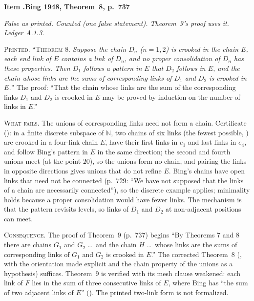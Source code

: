 \documentclass[11pt]{article}
\newcounter{defect}
\newenvironment{defect}[4]{%
  \par\addvspace{10pt}\refstepcounter{defect}%
  \noindent\textbf{Item \thedefect.\enspace #1}\par\nopagebreak
  \noindent\textit{#2}\par\nopagebreak\smallskip}{\par\addvspace{6pt}}
\newcommand{\fld}[1]{\par\noindent\textsc{#1.}\enspace}
\begin{document}
\begin{defect}{Bing 1948, Theorem~8, p.~737}{False as printed. Counted (one false statement).
Theorem~9's proof uses it. Ledger A.1.3.}{1}{0}\label{it:b48-8}

\fld{Printed} ``\textsc{Theorem 8.} \emph{Suppose the chain $D_n$ ($n=1,2$) is crooked in the chain
$E$, each end link of $E$ contains a link of $D_n$, and no proper consolidation of $D_n$ has these
properties. Then $D_1$ follows a pattern in $E$ that $D_2$ follows in $E$, and the chain whose
links are the sums of corresponding links of $D_1$ and $D_2$ is crooked in $E$.}'' The proof:
``That the chain whose links are the sum of the corresponding links $D_1$ and $D_2$ is crooked in
$E$ may be proved by induction on the number of links in $E$.''

\fld{What fails} The unions of corresponding links need not form a chain. Certificate
(): in a finite discrete subspace of $\mathbb N$, two chains of six links
(the fewest possible, ) are crooked in a four-link chain $E$, have their
first links in $e_1$ and last links in $e_4$, and follow Bing's pattern in $E$ in the same
direction; the second and fourth unions meet (at the point $20$), so the unions form no chain, and
pairing the links in opposite directions gives unions that do not refine $E$. Bing's chains have
open links that need not be connected (p.~729: ``We have not supposed that the links of a chain
are necessarily connected''), so the discrete example applies; minimality holds because a proper
consolidation would have fewer links. The mechanism is that the pattern revisits levels, so links
of $D_1$ and $D_2$ at non-adjacent positions can meet.

\fld{Consequence} The proof of Theorem~9 (p.~737) begins ``By Theorems 7 and 8 there are chains
$G_1$ and $G_2$ \ldots\ and the chain $H$ \ldots\ whose links are the sums of corresponding links
of $G_1$ and $G_2$ is crooked in $E$.'' The corrected Theorem~8 (, with the
orientation made explicit and the chain property of the unions as a hypothesis) suffices.
Theorem~9 is verified with its mesh clause weakened: each link of $F$ lies in the sum of three
consecutive links of $E$, where Bing has ``the sum of two adjacent links of $E$''
(). The printed two-link form is not formalized.
\end{defect}
\end{document}

